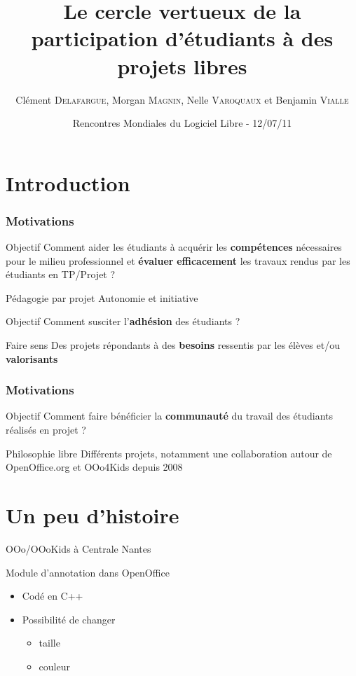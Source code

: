 \documentclass[hyperref,french,usenames,xcolor=dvipsnames]{beamer}
\title[OOo Edu]%
{Le cercle vertueux de la participation d'étudiants à des projets libres}
\author[C. \textsc{Delafargue}, M. \textsc{Magnin}, N. \textsc{Varoquaux}, B. \textsc{Vialle}]%
{Clément \textsc{Delafargue}, Morgan \textsc{Magnin}, Nelle \textsc{Varoquaux} et Benjamin \textsc{Vialle}
}
\institute[ECN]{
\structure{
École Centrale de Nantes}
}
\date[12/07/2011]{Rencontres Mondiales du Logiciel Libre - 12/07/11}
\begin{document}
\frame{\titlepage}


\section{Introduction}

\frame
{
  \frametitle{Motivations}

\begin{alertblock}{Objectif}
Comment aider les étudiants à acquérir les \textbf{compétences} nécessaires pour le milieu professionnel et \textbf{évaluer} \textbf{efficacement} les travaux rendus par les étudiants en TP/Projet ?
\end{alertblock}

\begin{block}{Pédagogie par projet}
Autonomie et initiative
\end{block}

\begin{alertblock}{Objectif}
Comment susciter l'\textbf{adhésion} des étudiants ? 
\end{alertblock}

\begin{block}{Faire sens}
Des projets répondants à des \textbf{besoins} ressentis par les élèves et/ou \textbf{valorisants}
\end{block}
}

\frame
{
  \frametitle{Motivations}

\begin{alertblock}{Objectif}
Comment faire bénéficier la \textbf{communauté} du travail des étudiants réalisés en projet ?
\end{alertblock}

\begin{block}{Philosophie libre}
Différents projets, notamment une collaboration autour de OpenOffice.org et OOo4Kids depuis 2008
\end{block}
}

\section{Un peu d'histoire}

\begin{frame}{OOo/OOoKids à Centrale Nantes}
    \begin{block}{Module d'annotation dans OpenOffice}
	\begin{itemize}
	    \item Codé en C++
	    \item Possibilité de changer
	    \begin{itemize}
		\item taille
		\item couleur
	    \end{itemize}
	\end{itemize}
    \end{block}
\end{frame}
\end{document}

